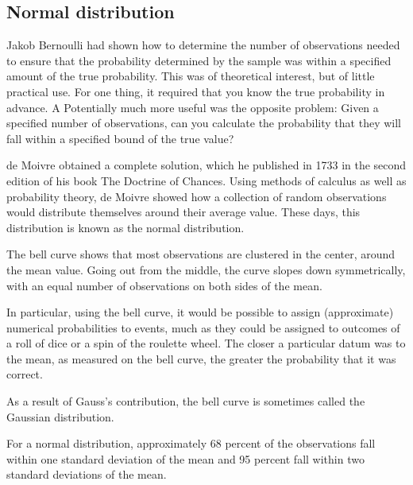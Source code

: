 \subsection{Normal distribution}

Jakob Bernoulli had shown how to determine the number of observations needed to ensure that the probability determined by the sample was within a specified amount of the true probability. This was of theoretical interest, but of little practical use. For one thing, it required that you know the true probability in advance. A Potentially much more useful was the opposite problem: Given a specified number of observations, can you calculate the probability that they will fall within a specified bound of the true value?

de Moivre obtained a complete solution, which he published in 1733 in the second edition of his book The Doctrine of Chances. Using methods of calculus as well as probability theory, de Moivre showed how a collection of random observations would distribute themselves around their average value. These days, this distribution is known as the normal distribution.


The bell curve shows that most observations are clustered in the center, around the mean value. Going out from the middle, the curve slopes down symmetrically, with an equal number of observations on both sides of the mean.

In particular, using the bell curve, it would be possible to assign (approximate) numerical probabilities to events, much as they could be assigned to outcomes of a roll of dice or a spin of the roulette wheel. The closer a particular datum was to the mean, as measured on the bell curve, the greater the probability that it was correct. 

As a result of Gauss’s contribution, the bell curve is sometimes called the Gaussian distribution.
 

For a normal distribution, approximately 68 percent of the observations fall within one standard deviation of the mean and 95 percent fall within two standard deviations of the mean.


